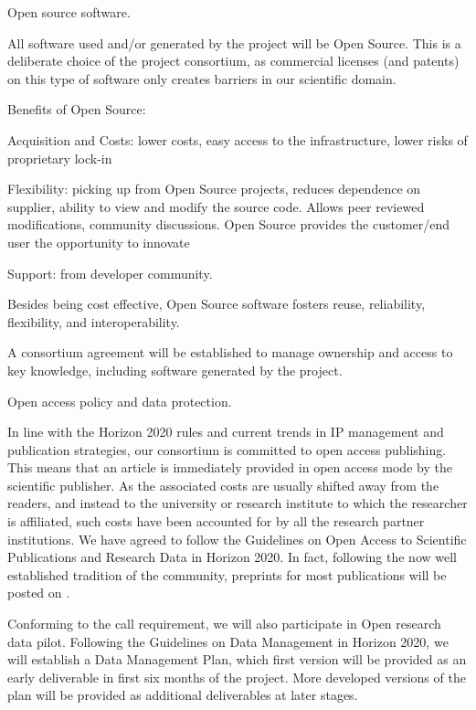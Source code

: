 
Open source software.


All software used and/or generated by the project will be Open Source.
This is a deliberate choice of the project consortium, as commercial
licenses (and patents) on this type of software only creates barriers
in our scientific domain.

Benefits of Open Source:

Acquisition and Costs: lower costs, easy access to the infrastructure,
lower risks of proprietary lock-in

Flexibility: picking up from Open Source projects, reduces dependence on
supplier, ability to view and modify the source code. Allows peer
reviewed modifications, community discussions. Open Source provides the
customer/end user the opportunity to innovate

Support: from developer community.

Besides being cost effective, Open Source software fosters
reuse, reliability, flexibility, and interoperability.

A consortium agreement will be established to manage ownership and
access to key knowledge, including software generated by the project.

Open access policy and data protection.

In line with the Horizon 2020 rules and current trends in IP
management and publication strategies, our consortium is committed to
open access publishing. This means that an article is immediately
provided in open access mode by the scientific publisher. As the
associated costs are usually shifted away from the readers, and
instead to the university or research institute to which the
researcher is affiliated, such costs have been accounted for by all
the research partner institutions. We have agreed to follow the
Guidelines on Open Access to Scientific Publications and Research Data
in Horizon 2020. In fact, following the now well established tradition
of the community, preprints for most publications will be posted on
\Arxiv.

Conforming to the call requirement, we will also participate in Open
research data pilot.  Following the Guidelines on Data Management in
Horizon 2020, we will establish a Data Management Plan, which first
version will be provided as an early deliverable in first six months of
the project. More developed versions of the plan will be provided as
additional deliverables at later stages.

